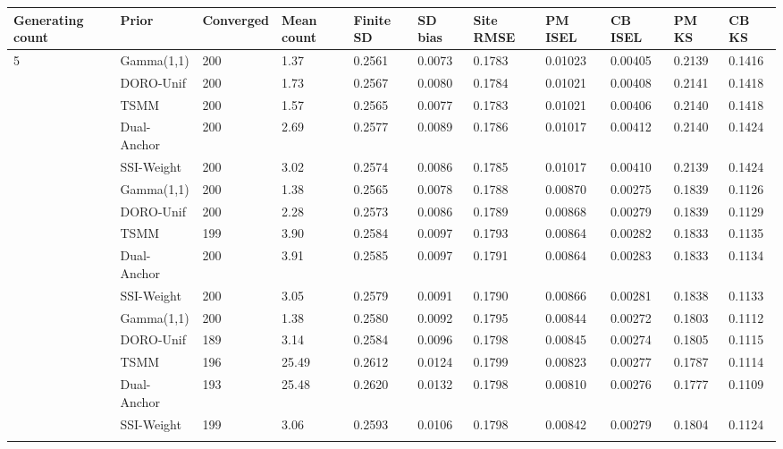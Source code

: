 \begin{longtable}{lllllllllll}
\toprule
Generating count & Prior & Converged & Mean count & Finite SD & SD bias & Site RMSE & PM ISEL & CB ISEL & PM KS & CB KS \\
\midrule\endhead
5 & Gamma(1,1) & 200 & 1.37 & 0.2561 & 0.0073 & 0.1783 & 0.01023 & 0.00405 & 0.2139 & 0.1416 \\ \addlinespace[3pt]
5 & DORO-Unif & 200 & 1.73 & 0.2567 & 0.0080 & 0.1784 & 0.01021 & 0.00408 & 0.2141 & 0.1418 \\ \addlinespace[3pt]
5 & TSMM & 200 & 1.57 & 0.2565 & 0.0077 & 0.1783 & 0.01021 & 0.00406 & 0.2140 & 0.1418 \\ \addlinespace[3pt]
5 & Dual-Anchor & 200 & 2.69 & 0.2577 & 0.0089 & 0.1786 & 0.01017 & 0.00412 & 0.2140 & 0.1424 \\ \addlinespace[3pt]
5 & SSI-Weight & 200 & 3.02 & 0.2574 & 0.0086 & 0.1785 & 0.01017 & 0.00410 & 0.2139 & 0.1424 \\ \addlinespace[3pt]
10 & Gamma(1,1) & 200 & 1.38 & 0.2565 & 0.0078 & 0.1788 & 0.00870 & 0.00275 & 0.1839 & 0.1126 \\ \addlinespace[3pt]
10 & DORO-Unif & 200 & 2.28 & 0.2573 & 0.0086 & 0.1789 & 0.00868 & 0.00279 & 0.1839 & 0.1129 \\ \addlinespace[3pt]
10 & TSMM & 199 & 3.90 & 0.2584 & 0.0097 & 0.1793 & 0.00864 & 0.00282 & 0.1833 & 0.1135 \\ \addlinespace[3pt]
10 & Dual-Anchor & 200 & 3.91 & 0.2585 & 0.0097 & 0.1791 & 0.00864 & 0.00283 & 0.1833 & 0.1134 \\ \addlinespace[3pt]
10 & SSI-Weight & 200 & 3.05 & 0.2579 & 0.0091 & 0.1790 & 0.00866 & 0.00281 & 0.1838 & 0.1133 \\ \addlinespace[3pt]
30 & Gamma(1,1) & 200 & 1.38 & 0.2580 & 0.0092 & 0.1795 & 0.00844 & 0.00272 & 0.1803 & 0.1112 \\ \addlinespace[3pt]
30 & DORO-Unif & 189 & 3.14 & 0.2584 & 0.0096 & 0.1798 & 0.00845 & 0.00274 & 0.1805 & 0.1115 \\ \addlinespace[3pt]
30 & TSMM & 196 & 25.49 & 0.2612 & 0.0124 & 0.1799 & 0.00823 & 0.00277 & 0.1787 & 0.1114 \\ \addlinespace[3pt]
30 & Dual-Anchor & 193 & 25.48 & 0.2620 & 0.0132 & 0.1798 & 0.00810 & 0.00276 & 0.1777 & 0.1109 \\ \addlinespace[3pt]
30 & SSI-Weight & 199 & 3.06 & 0.2593 & 0.0106 & 0.1798 & 0.00842 & 0.00279 & 0.1804 & 0.1124 \\ \addlinespace[3pt]
\bottomrule\end{longtable}

